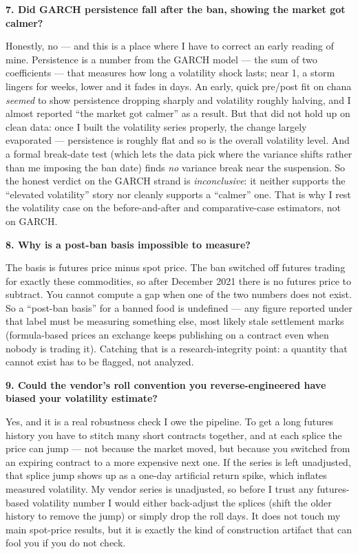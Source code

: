 \documentclass[11pt]{article}
\newcommand{\Q}[1]{\medskip\noindent\textbf{#1}\par}
\newcommand{\A}{\noindent}
\begin{document}
\Q{7. Did GARCH persistence fall after the ban, showing the market got calmer?}
\A Honestly, no --- and this is a place where I have to correct an early reading of mine. Persistence
is a number from the GARCH model --- the sum of two coefficients --- that measures how long a
volatility shock lasts; near 1, a storm lingers for weeks, lower and it fades in days. An early,
quick pre/post fit on chana \emph{seemed} to show persistence dropping sharply and volatility
roughly halving, and I almost reported ``the market got calmer'' as a result. But that did not hold
up on clean data: once I built the volatility series properly, the change largely evaporated ---
persistence is roughly flat and so is the overall volatility level. And a formal break-date test
(which lets the data pick where the variance shifts rather than me imposing the ban date) finds
\emph{no} variance break near the suspension. So the honest verdict on the GARCH strand is
\emph{inconclusive}: it neither supports the ``elevated volatility'' story nor cleanly supports a
``calmer'' one. That is why I rest the volatility case on the before-and-after and comparative-case
estimators, not on GARCH.

\Q{8. Why is a post-ban basis impossible to measure?}
\A The basis is futures price minus spot price. The ban switched off futures trading for exactly
these commodities, so after December 2021 there is no futures price to subtract. You cannot compute a
gap when one of the two numbers does not exist. So a ``post-ban basis'' for a banned food is
undefined --- any figure reported under that label must be measuring something else, most likely
stale settlement marks (formula-based prices an exchange keeps publishing on a contract even when
nobody is trading it). Catching that is a research-integrity point: a quantity that cannot exist has
to be flagged, not analyzed.

\Q{9. Could the vendor's roll convention you reverse-engineered have biased your volatility
estimate?}
\A Yes, and it is a real robustness check I owe the pipeline. To get a long futures history you have
to stitch many short contracts together, and at each splice the price can jump --- not because the
market moved, but because you switched from an expiring contract to a more expensive next one. If the
series is left unadjusted, that splice jump shows up as a one-day artificial return spike, which
inflates measured volatility. My vendor series is unadjusted, so before I trust any futures-based
volatility number I would either back-adjust the splices (shift the older history to remove the jump)
or simply drop the roll days. It does not touch my main spot-price results, but it is exactly the
kind of construction artifact that can fool you if you do not check.
\end{document}
